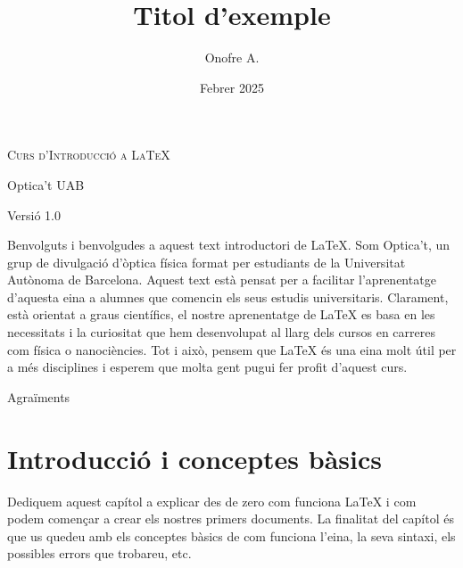 \documentclass[12pm,oneside,onecolumn,openany]{book}
\title{Titol d'exemple}
\author{Onofre A.}
\date{Febrer 2025}
\begin{document}
\newpage
\thispagestyle{empty}
\begin{titlepage}
    \centering
    \vspace*{\fill}  
    {\Huge \textsc{Curs d'Introducció a \LaTeX{}} \par}
    \vspace{1cm}
    {\Large Optica't UAB \par}
    \vspace{0.5cm}
    {\large Versió 1.0 \par}
    \vspace{5cm}
    \vspace*{\fill} 
\end{titlepage}


\newpage

\thispagestyle{empty}
Benvolguts i benvolgudes a aquest text introductori de LaTeX. Som Optica't, un grup de divulgació d'òptica física format per estudiants de la Universitat Autònoma de Barcelona. Aquest text està pensat per a facilitar l'aprenentatge d'aquesta eina a alumnes que comencin els seus estudis universitaris. Clarament, està orientat a graus científics, el nostre aprenentatge de LaTeX es basa en les necessitats i la curiositat que hem desenvolupat al llarg dels cursos en carreres com física o nanociències. Tot i això, pensem que LaTeX és una eina molt útil per a més disciplines i esperem que molta gent pugui fer profit d'aquest curs.

\newpage
\tableofcontents
\pagestyle{empty}
\newpage
Agraïments
\newpage
\pagestyle{fancy}
\chapter{Introducció i conceptes bàsics}
\thispagestyle{empty}

Dediquem aquest capítol a explicar des de zero com funciona LaTeX i com podem començar a crear els nostres primers documents. La finalitat del capítol és que us quedeu amb els conceptes bàsics de com funciona l'eina, la seva sintaxi, els possibles errors que trobareu, etc.
\end{document}
